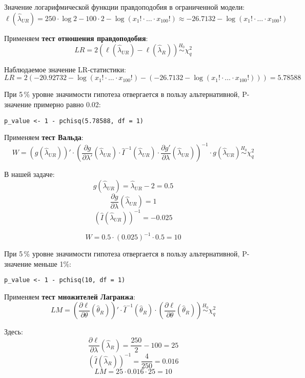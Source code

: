 \begin{problem}
\begin{sol}
\begin{enumerate}
Значение логарифмической функции правдоподобия в ограниченной модели:
\[ \ell(\hat{\lambda}_{UR}) = 250 \cdot \log 2 - 100 \cdot 2 -  \log \left(x_1!\cdot \ldots \cdot x_{100}! \right) \approx -26.7132 - \log \left(x_1!\cdot \ldots \cdot x_{100}! \right) \]

Применяем \textbf{тест отношения правдоподобия}:
\[LR = 2\left(\ell(\hat{\lambda}_{UR}) - \ell(\hat{\lambda}_R)\right) \overset{H_0}{\sim} \chi^2_q\]

Наблюдаемое значение LR-статистики:
\[ LR =2\left(-20.92732 - \log \left(x_1!\cdot \ldots \cdot x_{100}!\right) - \left(-26.7132 - \log \left(x_1!\cdot \ldots \cdot x_{100}! \right) \right)\right) = 5.78588\]

При 5\,\% уровне значимости гипотеза отвергается в пользу альтернативной, P-значение примерно равно 0.02:
\begin{verbatim}
p_value <- 1 - pchisq(5.78588, df = 1)
\end{verbatim}

Применяем \textbf{тест Вальда}:
\[W = \left(g\left(\hat{\lambda}_{UR} \right) \right)' \cdot \left( \dfrac{\partial g}{\partial \lambda'}\left(\hat{\lambda}_{UR} \right) \cdot \widehat{I}^{-1} \left(\hat{\lambda}_{UR} \right) \cdot \dfrac{\partial g'}{\partial \lambda}\left(\hat{\lambda}_{UR} \right) \right)^{-1} \cdot g\left(\hat{\lambda}_{UR} \right) \overset{H_0}{\sim} \chi^2_q \]

В нашей задаче:
\[g\left(\hat{\lambda}_{UR} \right) = \hat{\lambda}_{UR} - 2 = 0.5\]
\[ \dfrac{\partial g}{\partial \lambda}\left(\hat{\lambda}_{UR} \right) = 1\]
\[\left(\hat{I} \left(\hat{\lambda}_{UR} \right) \right)^{-1} = -0.025 \]

\[W = 0.5 \cdot \left(0.025 \right)^{-1} \cdot 0.5 = 10 \]

При 5\,\% уровне значимости гипотеза отвергается в пользу альтернативной, P-значение меньше 1\%:
\begin{verbatim}
p_value <- 1 - pchisq(10, df = 1)
\end{verbatim}

Применяем \textbf{тест множителей Лагранжа}:
\[LM = \left(\dfrac{\partial \ell}{\partial \theta}\left(\hat{\theta}_R \right)\right)' \cdot \widehat{I}^{-1} \left(\hat{\theta}_R \right) \cdot \left(\dfrac{\partial \ell}{\partial \theta}\left(\hat{\theta}_R \right)\right) \overset{H_0}{\sim} \chi^2_q \]

Здесь:
\[\frac{\partial \ell}{\partial \lambda} \left(\hat{\lambda}_R \right) = \frac{250}{2} - 100 = 25\]
\[\left(\hat{I} \left(\hat{\lambda}_{R} \right) \right)^{-1} = \frac{4}{250} = 0.016\]
\[LM = 25 \cdot 0.016 \cdot 25 = 10\]


\end{enumerate}
\end{sol}
\end{problem}
